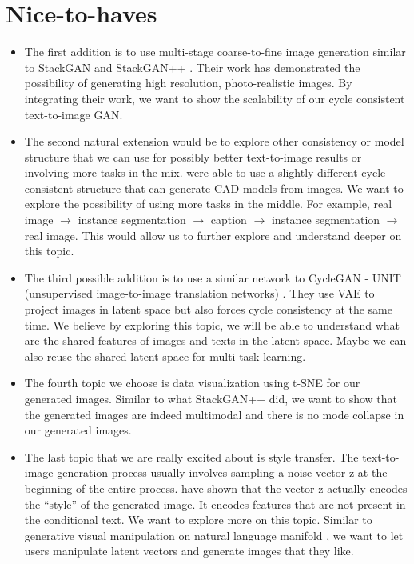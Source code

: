 \documentclass[]{article}
\begin{document}
\section{Nice-to-haves}
\begin{itemize}

	\item The first addition is to use multi-stage coarse-to-fine image generation similar to StackGAN and StackGAN++ \cite{zhang2017stackgan}\cite{DBLP:journals/corr/abs-1710-10916}. Their work has demonstrated the possibility of generating high resolution, photo-realistic images. By integrating their work, we want to show the scalability of our cycle consistent text-to-image GAN.
	\item The second natural extension would be to explore other consistency or model structure that we can use for possibly better text-to-image results or involving more tasks in the mix. \cite{DBLP:journals/corr/ZhouKAHE16} were able to use a slightly different cycle consistent structure that can generate CAD models from images. We want to explore the possibility of using more tasks in the middle. For example,  real image $\to$ instance segmentation $\to$ caption $\to$ instance segmentation $\to$ real image. This would allow us to further explore and understand deeper on this topic.
	\item The third possible addition is to use a similar network to CycleGAN - UNIT (unsupervised image-to-image translation networks) \cite{liu2017unsupervised}. They use VAE to project images in latent space but also forces cycle consistency at the same time. We believe by exploring this topic, we will be able to understand what are the shared features of images and texts in the latent space. Maybe we can also reuse the shared latent space for multi-task learning.
	\item The fourth topic we choose is data visualization using t-SNE for our generated images. Similar to what StackGAN++ did, we want to show that the generated images are indeed multimodal and there is no mode collapse in our generated images.
	\item The last topic that we are really excited about is style transfer. The text-to-image generation process usually involves sampling a noise vector z at the beginning of the entire process. \cite{reed2016generative} have shown that the vector z actually encodes the “style” of the generated image. It encodes features that are not present in the conditional text. We want to explore more on this topic. Similar to generative visual manipulation on natural language manifold \cite{zhu2016generative}, we want to let users manipulate latent vectors and generate images that they like.
	
	
	
\end{itemize}


\end{document}
